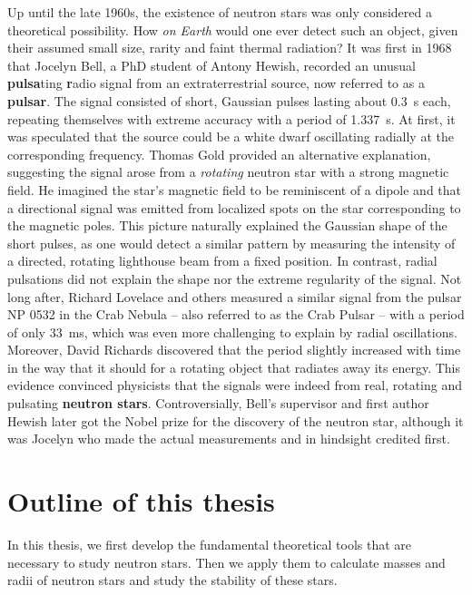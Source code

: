 Up until the late 1960s, the existence of neutron stars was only considered a theoretical possibility.
How \emph{on Earth} would one ever detect such an object, given their assumed small size, rarity and faint thermal radiation?
It was first in 1968 that Jocelyn Bell, a PhD student of Antony Hewish, recorded an unusual \textbf{pulsa}ting \textbf{r}adio signal from an extraterrestrial source, now referred to as a \textbf{pulsar}. \cite{ref:neutron_star_discovery_first}
The signal consisted of short, Gaussian pulses lasting about \SI{0.3}{\second} each, repeating themselves with extreme accuracy with a period of \SI{1.337}{\second}.
At first, it was speculated that the source could be a white dwarf oscillating radially at the corresponding frequency.
Thomas Gold provided an alternative explanation, suggesting the signal arose from a \emph{rotating} neutron star with a strong magnetic field. \cite{ref:neutron_star_gold}
He imagined the star's magnetic field to be reminiscent of a dipole and that a directional signal was emitted from localized spots on the star corresponding to the magnetic poles.
This picture naturally explained the Gaussian shape of the short pulses, as one would detect a similar pattern by measuring the intensity of a directed, rotating lighthouse beam from a fixed position.
In contrast, radial pulsations did not explain the shape nor the extreme regularity of the signal.
Not long after, Richard Lovelace and others measured a similar signal from the pulsar NP 0532 in the Crab Nebula -- also referred to as the Crab Pulsar -- with a period of only \SI{33}{\milli\second}, which was even more challenging to explain by radial oscillations. \cite{ref:crab_pulsar_period_discovery}
Moreover, David Richards discovered that the period slightly increased with time in the way that it should for a rotating object that radiates away its energy.
This evidence convinced physicists that the signals were indeed from real, rotating and pulsating \textbf{neutron stars}.
Controversially, Bell's supervisor and first author Hewish later got the Nobel prize for the discovery of the neutron star, although it was Jocelyn who made the actual measurements and in hindsight credited first.


\section{Outline of this thesis}

In this thesis, we first develop the fundamental theoretical tools that are necessary to study neutron stars.
Then we apply them to calculate masses and radii of neutron stars and study the stability of these stars.

